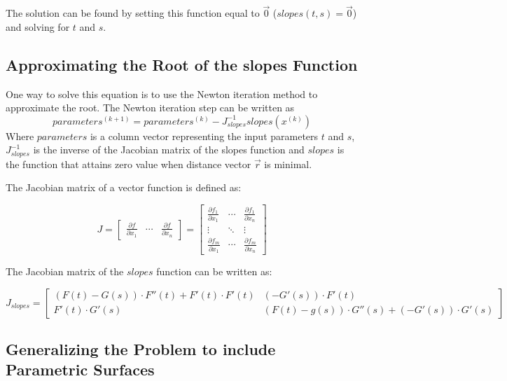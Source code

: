 \documentclass[A4]{article}
\begin{document}
The solution can be found by setting this function equal to $ \vec{0} $ ($slopes(t, s) = \vec{0}$) and solving for $t$ and $s$.

\subsection{Approximating the Root of the slopes Function}

One way to solve this equation is to use the Newton iteration method to approximate the root. The Newton iteration step can be written as
\begin{equation}
parameters^{(k + 1)} = parameters^{(k)} - J_{slopes}^{-1}slopes(x^{(k)})
\end{equation}
Where $parameters$ is a column vector representing the input parameters $t$ and $s$, $J_{slopes}^{-1}$ is the inverse of the Jacobian matrix of the slopes function and $slopes$ is the function that attains zero value when distance vector $\vec{r}$ is minimal.

The Jacobian matrix of a vector function is defined as:

\begin{equation} 
J = \begin{bmatrix} \frac{\partial f}{\partial x_{1}} & \cdots &\frac{\partial f}{\partial x_{n}}\end{bmatrix} = \begin{bmatrix} \frac{\partial f_{1}}{\partial x_{1}} & \cdots & \frac{\partial f_{1}}{\partial x_{n}}  \\ \vdots & \ddots  & \vdots \\ \frac{\partial f_{m}}{\partial x_{1}} & \cdots & \frac{\partial f_{m}}{\partial x_{n}}\end{bmatrix}
\end{equation}

The Jacobian matrix of the $slopes$ function can be written as:

\begin{equation}
J_{slopes} = \begin{bmatrix} (F(t) - G(s)) \cdot F''(t) + F'(t) \cdot F'(t) &  (-G'(s)) \cdot F'(t) 
 \\ F'(t) \cdot G'(s) & ( F(t) - g(s) ) \cdot G''(s) + (-G'(s)) \cdot G'(s) \end{bmatrix}
\end{equation}

\subsection{Generalizing the Problem to include Parametric Surfaces}
\end{document}
